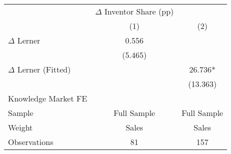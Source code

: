 {
\def\sym#1{\ifmmode^{#1}\else\(^{#1}\)\fi}
\begin{tabular}{l*{2}{c}}
\hline\hline
                    &$\Delta$ Inventor Share (pp)   &               \\
                    &\multicolumn{1}{c}{(1)}   &\multicolumn{1}{c}{(2)}   \\
\hline
$\Delta$ Lerner     &       0.556   &               \\
                    &     (5.465)   &               \\
$\Delta$ Lerner (Fitted)&               &      26.736*  \\
                    &               &    (13.363)   \\
\hline
Knowledge Market FE &               &               \\
Sample              & Full Sample   & Full Sample   \\
Weight              &       Sales   &       Sales   \\
Observations        &          81   &         157   \\
\hline\hline
\end{tabular}
}
